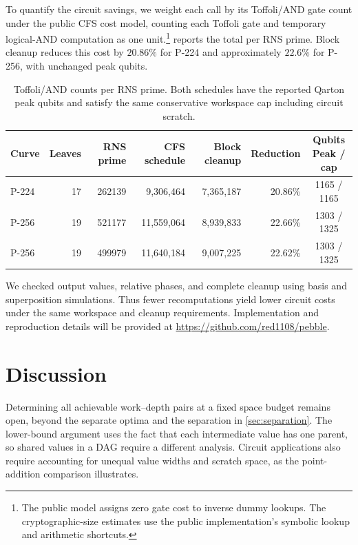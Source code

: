 \documentclass[11pt]{article}
\theoremstyle{definition}
\theoremstyle{remark}
\begin{document}
To quantify the circuit savings, we weight each call by its
Toffoli/AND gate count under the public CFS cost model, counting
each Toffoli gate and temporary logical-AND computation as one
unit.\footnote{
The public model assigns zero gate cost to inverse dummy lookups.
The cryptographic-size estimates use the public implementation's
symbolic lookup and arithmetic shortcuts.}
 reports the total per RNS prime.
Block cleanup reduces this cost by $20.86\%$ for P-224 and
approximately $22.6\%$ for P-256, with unchanged peak qubits.

\begin{table}[H]
\centering
\small
\setlength{\tabcolsep}{3.2pt}
\renewcommand{\arraystretch}{1.15}
\begin{tabular}{@{}lrrrrrc@{}}
\toprule
Curve & Leaves & RNS prime & CFS schedule & Block cleanup
& Reduction & \shortstack{Qubits\\Peak / cap} \\
\midrule
P-224 & 17 & 262139 & 9,306,464 & 7,365,187
& 20.86\% & 1165 / 1165 \\
P-256 & 19 & 521177 & 11,559,064 & 8,939,833
& 22.66\% & 1303 / 1325 \\
P-256 & 19 & 499979 & 11,640,184 & 9,007,225
& 22.62\% & 1303 / 1325 \\
\bottomrule
\end{tabular}
\caption{Toffoli/AND counts per RNS prime. Both schedules have
the reported Qarton peak qubits and satisfy the same conservative
workspace cap including circuit scratch.}
\label{tab:cfs-application}
\end{table}

We checked output values, relative phases, and complete cleanup
using basis and superposition simulations.
Thus fewer recomputations yield lower circuit costs under
the same workspace and cleanup requirements.
Implementation and reproduction details will be provided at
\url{https://github.com/red1108/pebble}.


\section{Discussion}

Determining all achievable work--depth pairs at a fixed space budget remains open, beyond the separate optima and the separation in \cref{sec:separation}. The lower-bound argument uses the fact that each intermediate value has one parent, so shared values in a DAG require a different analysis. Circuit applications also require accounting for unequal value widths and scratch space, as the point-addition comparison illustrates.

\printbibliography
\end{document}
